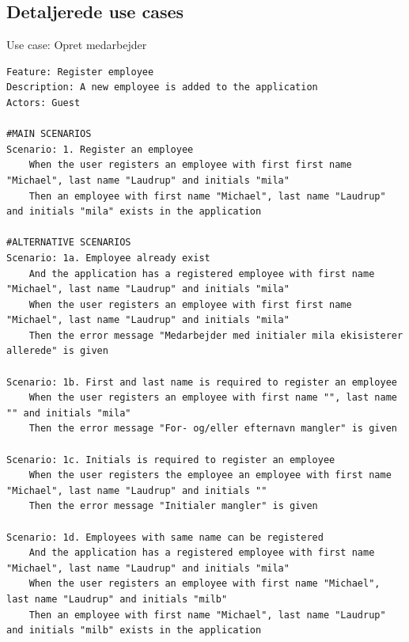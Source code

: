 \subsection{Detaljerede use cases}
\begin{listing}[H]
    \centering
    \caption{Use case: Opret medarbejder}\label{lst:usecase_register_employee}
    \begin{verbatim}  
Feature: Register employee
Description: A new employee is added to the application
Actors: Guest

#MAIN SCENARIOS
Scenario: 1. Register an employee
    When the user registers an employee with first first name "Michael", last name "Laudrup" and initials "mila"
    Then an employee with first name "Michael", last name "Laudrup" and initials "mila" exists in the application

#ALTERNATIVE SCENARIOS
Scenario: 1a. Employee already exist
    And the application has a registered employee with first name "Michael", last name "Laudrup" and initials "mila"
    When the user registers an employee with first first name "Michael", last name "Laudrup" and initials "mila"
    Then the error message "Medarbejder med initialer mila ekisisterer allerede" is given

Scenario: 1b. First and last name is required to register an employee
    When the user registers an employee with first name "", last name "" and initials "mila"
    Then the error message "For- og/eller efternavn mangler" is given

Scenario: 1c. Initials is required to register an employee
    When the user registers the employee an employee with first name "Michael", last name "Laudrup" and initials ""
    Then the error message "Initialer mangler" is given

Scenario: 1d. Employees with same name can be registered
    And the application has a registered employee with first name "Michael", last name "Laudrup" and initials "mila"
    When the user registers an employee with first name "Michael", last name "Laudrup" and initials "milb"
    Then an employee with first name "Michael", last name "Laudrup" and initials "milb" exists in the application
    \end{verbatim}
\end{listing}
